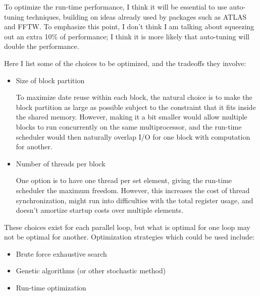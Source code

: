 \documentclass[12pt]{article}
\begin{document}
To optimize the run-time performance, I think it will be essential
to use auto-tuning techniques, building on ideas already used by
packages such as ATLAS and FFTW.  To emphasize this point, I don't
think I am talking about squeezing out an extra 10\% of performance;
I think it is more likely that auto-tuning will double the performance.


Here I list some of the choices to be optimized, and the tradeoffs
they involve:
\begin{itemize}
\item
Size of block partition

To maximize date reuse within each block, the natural choice is
to make the block partition as large as possible subject to the
constraint that it fits inside the shared memory.  However,
making it a bit smaller would allow multiple blocks to run
concurrently on the same multiprocessor, and the run-time
scheduler would then naturally overlap I/O for one block
with computation for another.

\item
Number of threads per block

One option is to have one thread per set element, giving the
run-time scheduler the maximum freedom.  However, this increases
the cost of thread synchronization, might run into difficulties
with the total register usage, and doesn't amortize startup
costs over multiple elements.

\end{itemize}


These choices exist for each parallel loop, but what is optimal
for one loop may not be optimal for another.
Optimization strategies which could be used include:
\begin{itemize}
\item
Brute force exhaustive search

%

\item
Genetic algorithms (or other stochastic method)


\item
Run-time optimization


\end{itemize}
\end{document}
